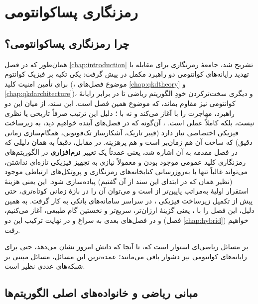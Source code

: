 \chapter{رمزنگاری پساکوانتومی }
\label{chap:pqc}

\section{چرا رمزنگاری پساکوانتومی؟}

همان‌طور که در فصل \ref{chap:introduction} تشریح شد، جامعهٔ رمزنگاری برای مقابله با تهدید رایانه‌های کوانتومی دو راهبرد مکمل در پیش گرفت: یکی تکیه بر فیزیک کوانتوم برای تأمین امنیت کلید (، موضوع فصل‌های \ref{chap:qkdtheory} و \ref{chap:qkdarchitecture})، و دیگری سخت‌ترکردن خودِ الگوریتم ریاضی تا در برابر رایانهٔ کوانتومی نیز مقاوم بماند، که موضوع همین فصل است. این سند، از میان این دو راهبرد، مهاجرت را با  آغاز می‌کند و نه با ؛ دلیل این ترتیب صرفاً تاریخی یا نظری نیست، بلکه کاملاً عملی است. ، آن‌گونه که در فصل‌های آینده خواهیم دید، به زیرساخت فیزیکی اختصاصی نیاز دارد (فیبر تاریک، آشکارساز تک‌فوتونی، همگام‌سازی زمانی دقیق) که ساخت آن هم زمان‌بر است و هم پرهزینه.  در مقابل، دقیقاً به همان دلیلی که در فصل مقدمه به آن اشاره شد، یعنی عمدتاً یک تغییر \textbf{نرم‌افزاری} در الگوریتم‌های رمزنگاری کلید عمومی موجود بودن و معمولاً نیازی به تجهیز فیزیکی تازه‌ای نداشتن، می‌تواند غالباً تنها با به‌روزرسانی کتابخانه‌های رمزنگاری و پروتکل‌های ارتباطی موجود (نظیر  همان  که در ابتدای این سند از آن گفتیم) پیاده‌سازی شود. این یعنی هزینهٔ استقرار اولیهٔ  به‌مراتب پایین‌تر از  است و می‌توان آن را در بازهٔ زمانی کوتاه‌تری، حتی پیش از تکمیل زیرساخت فیزیکی ، در سراسر سامانه‌های بانکی به کار گرفت. به همین دلیل، این فصل را با ، یعنی گزینهٔ ارزان‌تر، سریع‌تر و نخستین گام طبیعی، آغاز می‌کنیم، و در فصل‌های بعدی به سراغ  و در نهایت ترکیب این دو (فصل \ref{chap:hybrid}) خواهیم رفت.

 بر مسائل ریاضی‌ای استوار است که، تا آنجا که دانش امروز نشان می‌دهد، حتی برای رایانه‌های کوانتومی نیز دشوار باقی می‌مانند؛ عمده‌ترین این مسائل، مسائل مبتنی بر شبکه‌های عددی  نظیر  است.

\section{مبانی ریاضی و خانواده‌های اصلی الگوریتم‌ها}
\label{sec:pqcfoundations}

